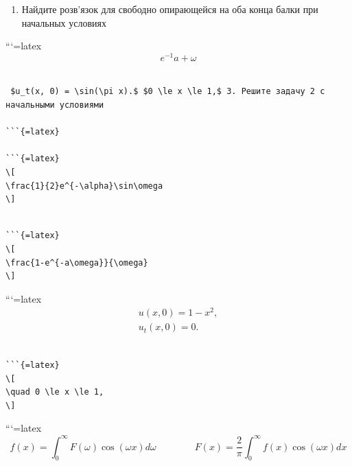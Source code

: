 \documentclass[
  ukrainian,
]{article}
\providecommand{\tightlist}{%
  \setlength{\itemsep}{0pt}\setlength{\parskip}{0pt}}
\begin{document}
\begin{enumerate}
\def\labelenumi{\arabic{enumi}.}
\setcounter{enumi}{1}
\tightlist
\item
  Найдите розв'язок для свободно опирающейся на оба конца балки при
  начальных условиях
\end{enumerate}

```{=latex}
\[
e^{-1}a + \omega
\]

\begin{verbatim}

 $u_t(x, 0) = \sin(\pi x).$ $0 \le x \le 1,$ 3. Решите задачу 2 с начальными условиями

```{=latex}

```{=latex}
\[
\frac{1}{2}e^{-\alpha}\sin\omega
\]
\end{verbatim}

\begin{verbatim}

```{=latex}
\[
\frac{1-e^{-a\omega}}{\omega}
\]
\end{verbatim}

```{=latex}
\[
\begin{aligned} u(x, 0) = 1 - x^2, \\ u_t(x, 0) = 0. \end{aligned}
\]

\begin{verbatim}

```{=latex}
\[
\quad 0 \le x \le 1,
\]
\end{verbatim}

```{=latex}
\[
f(x) = \int_{0}^{\infty} F(\omega) \cos(\omega x) d\omega \qquad \qquad F(x) = \frac{2}{\pi} \int_{0}^{\infty} f(x) \cos(\omega x) dx
\]
\end{document}
